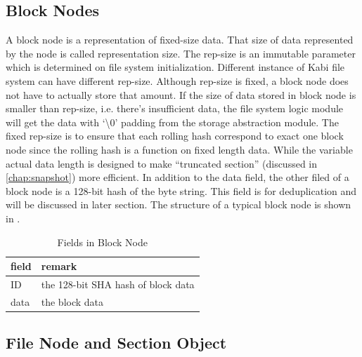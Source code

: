 \subsection{Block Nodes}

    A block node is a representation of fixed-size data. That size of data represented by the node is called representation size. The rep-size is an immutable parameter which is determined on file system initialization. Different instance of Kabi file system can have different rep-size. Although rep-size is fixed, a block node does not have to actually store that amount. If the size of data stored in block node is smaller than rep-size, i.e. there's insufficient data, the file system logic module will get the data with `\textbackslash0' padding from the storage abstraction module. The fixed rep-size is to ensure that each rolling hash correspond to exact one block node since the rolling hash is a function on fixed length data. While the variable actual data length is designed to make ``truncated section'' (discussed in \cref{chap:snapshot}) more efficient. In addition to the data field, the other filed of a block node is a 128-bit hash of the byte string. This field is for deduplication and will be discussed in later section. The structure of a typical block node is shown in .

\begin{table}[t]
\label{tab:block_fields}
\begin{center}
\begin{tabular}{ll}
\toprule
field & remark\\
\midrule
ID & the 128-bit SHA hash of block data\\
data & the block data\\
\bottomrule
\end{tabular}
\end{center}
\caption{Fields in Block Node}
\end{table}

\subsection{File Node and Section Object}

